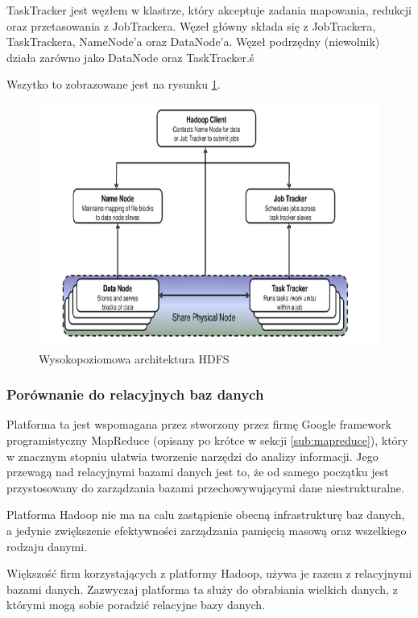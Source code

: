 TaskTracker jest węzłem w klastrze, który akceptuje zadania mapowania, redukcji oraz przetasowania z JobTrackera. Węzeł główny składa się z JobTrackera, TaskTrackera, NameNode'a oraz DataNode'a. Węzeł podrzędny (niewolnik) działa zarówno jako DataNode oraz TaskTracker.ś

Wszytko to zobrazowane jest na rysunku \ref{fig:hdfs_hight_level_architecture}.

\begin{figure}[h]
    \centerline{\includegraphics[scale=0.5]{obrazki/wysokopoziomowa_architektura_hadoop.png}}
    \caption{Wysokopoziomowa architektura HDFS}
    \label{fig:hdfs_hight_level_architecture}
\end{figure}


\subsubsection{Porównanie do relacyjnych baz danych}
\label{ssub:porownanie_z_relacyjnymi}
Platforma ta jest wspomagana przez stworzony przez firmę Google framework programistyczny MapReduce (opisany po krótce w sekcji \ref{sub:mapreduce}), który w znacznym stopniu ułatwia tworzenie narzędzi do analizy informacji. Jego przewagą nad relacyjnymi bazami danych jest to, że od samego początku jest przystosowany do zarządzania bazami przechowywującymi dane niestrukturalne.

Platforma Hadoop nie ma na calu zastąpienie obecną infrastrukturę baz danych, a jedynie zwiększenie efektywności zarządzania pamięcią masową oraz wszelkiego rodzaju danymi.

Większość firm korzystających z platformy Hadoop, używa je razem z relacyjnymi bazami danych. Zazwyczaj platforma ta służy do obrabiania wielkich danych, z którymi mogą sobie poradzić relacyjne bazy danych.


